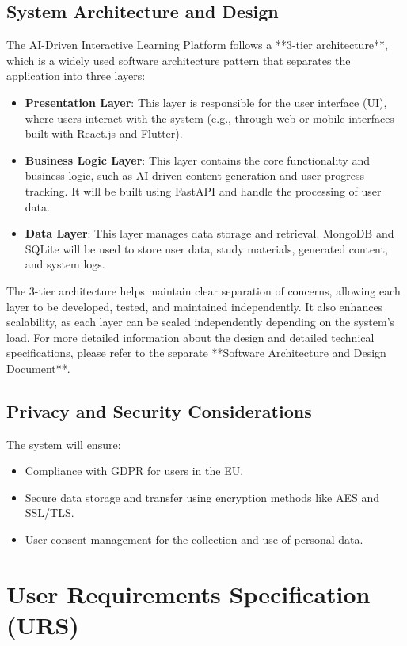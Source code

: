 \documentclass{article}
\begin{document}
\subsection{System Architecture and Design}
The AI-Driven Interactive Learning Platform follows a **3-tier architecture**, which is a widely used software architecture pattern that separates the application into three layers:

\begin{itemize}
    \item \textbf{Presentation Layer}: This layer is responsible for the user interface (UI), where users interact with the system (e.g., through web or mobile interfaces built with React.js and Flutter).
    \item \textbf{Business Logic Layer}: This layer contains the core functionality and business logic, such as AI-driven content generation and user progress tracking. It will be built using FastAPI and handle the processing of user data.
    \item \textbf{Data Layer}: This layer manages data storage and retrieval. MongoDB and SQLite will be used to store user data, study materials, generated content, and system logs.
\end{itemize}

The 3-tier architecture helps maintain clear separation of concerns, allowing each layer to be developed, tested, and maintained independently. It also enhances scalability, as each layer can be scaled independently depending on the system's load. For more detailed information about the design and detailed technical specifications, please refer to the separate **Software Architecture and Design Document**.

\subsection{Privacy and Security Considerations}
The system will ensure:
\begin{itemize}
    \item Compliance with GDPR for users in the EU.
    \item Secure data storage and transfer using encryption methods like AES and SSL/TLS.
    \item User consent management for the collection and use of personal data.
\end{itemize}

\section{User Requirements Specification (URS)}
\end{document}
